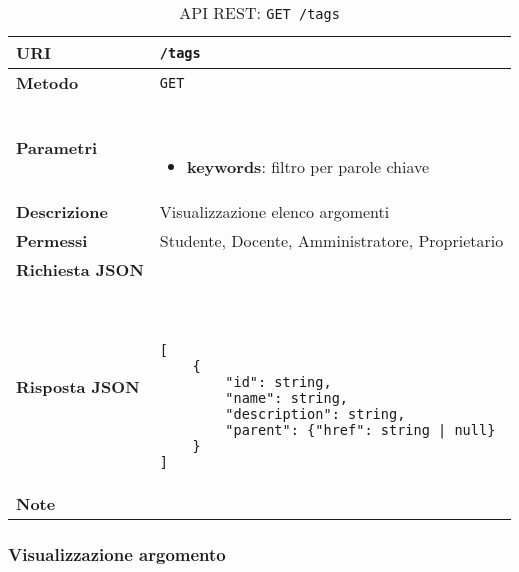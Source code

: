         \begin{table}[H]
            \begin{center}
                \begin{tabular}{p{} p{}}
                    \toprule
                    \textbf{URI} & \texttt{/tags} \\ \midrule
                    \textbf{Metodo} & \texttt{GET} \\ \midrule
                    \textbf{Parametri} & \
                        \begin{itemize}
                            \item \textbf{keywords}: filtro per parole chiave
                        \end{itemize}
                        \\ \midrule
                    \textbf{Descrizione} & Visualizzazione elenco argomenti \\ \midrule
                    \textbf{Permessi} & Studente, Docente, Amministratore, Proprietario  \\ \midrule
                    \textbf{Richiesta JSON} & \\ \midrule
                    \textbf{Risposta JSON} & \
                        \begin{lstlisting}[basicstyle={\ttfamily}]
[
    {
        "id": string,
        "name": string,
       	"description": string,
    	"parent": {"href": string | null}
    }
]
                        \end{lstlisting}
                        \\ \midrule
                    \textbf{Note} & \\
                    \bottomrule
                \end{tabular}
                \caption{API REST: \texttt{GET /tags}}
            \end{center}
        \end{table}

    \subsubsection{Visualizzazione argomento}

